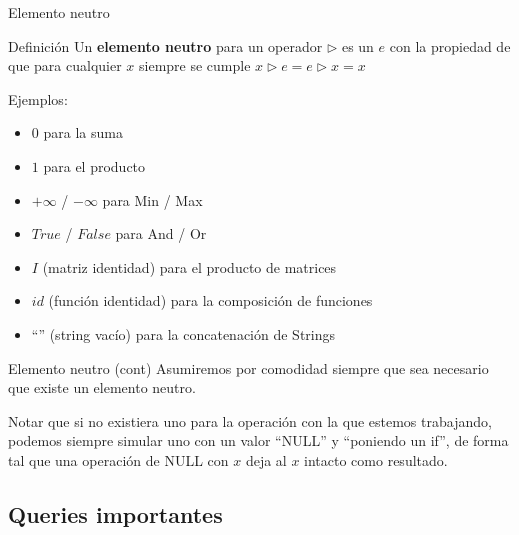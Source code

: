 \documentclass{beamer}
\begin{document}
\begin{frame}{Elemento neutro}
  \begin{block}{Definición}
    Un \textbf{elemento neutro} para un operador $\triangleright$ es un $e$ con la propiedad de que para cualquier $x$ siempre se cumple $x \triangleright e = e \triangleright x = x$
  \end{block}
  \pause
  Ejemplos:
  \begin{itemize}
  \item $0$ para la suma
  \item $1$ para el producto
  \item $+\infty$ / $-\infty$ para Min / Max
  \item $True$ / $False$ para And / Or
  \item $I$ (matriz identidad) para el producto de matrices
  \item $id$ (función identidad) para la composición de funciones
  \item ``'' (string vacío) para la concatenación de Strings
  \end{itemize}

\end{frame}

\begin{frame}{Elemento neutro (cont)}
  Asumiremos por comodidad siempre que sea necesario que existe un elemento neutro.

  Notar que si no existiera uno para la operación con la que estemos trabajando, podemos siempre simular uno con un valor ``NULL'' y ``poniendo un if'',
  de forma tal que una operación de NULL con $x$ deja al $x$ intacto como resultado.

\end{frame}

\subsection{Queries importantes}
\end{document}
